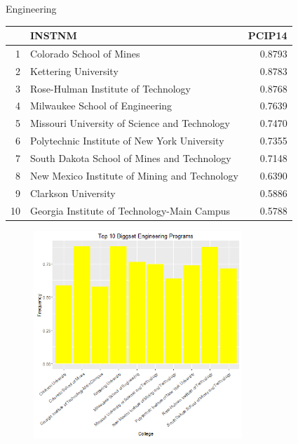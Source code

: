 \documentclass{article}
\begin{document}
Engineering
\begin{table}[ht]
\centering
\begin{tabular}{rlr}
  \hline
 & INSTNM & PCIP14 \\ 
  \hline
1 & Colorado School of Mines & 0.8793 \\ 
  2 & Kettering University & 0.8783 \\ 
  3 & Rose-Hulman Institute of Technology & 0.8768 \\ 
  4 & Milwaukee School of Engineering & 0.7639 \\ 
  5 & Missouri University of Science and Technology & 0.7470 \\ 
  6 & Polytechnic Institute of New York University & 0.7355 \\ 
  7 & South Dakota School of Mines and Technology & 0.7148 \\ 
  8 & New Mexico Institute of Mining and Technology & 0.6390 \\ 
  9 & Clarkson University & 0.5886 \\ 
  10 & Georgia Institute of Technology-Main Campus & 0.5788 \\ 
   \hline
\end{tabular}
\end{table}
\begin{figure}[H]
\includegraphics[width=0.7\textwidth]{../images/biggestEngineering.png}
\end{figure}

\clearpage
\end{document}
